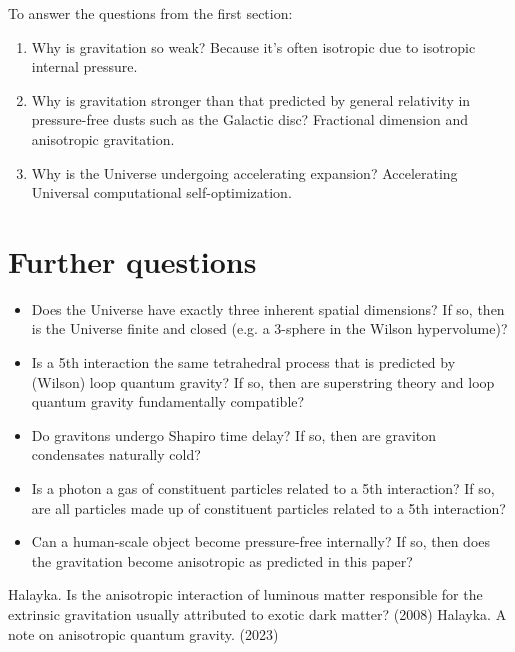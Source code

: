 \documentclass[12pt]{article}
\begin{document}
To answer the questions from the first section:
\begin{enumerate}
\item Why is gravitation so weak? 
Because it's often isotropic due to isotropic internal pressure.
\item Why is gravitation stronger than that predicted by general relativity in pressure-free dusts such as the Galactic disc? 
Fractional dimension and anisotropic gravitation.
\item Why is the Universe undergoing accelerating expansion? 
Accelerating Universal computational self-optimization.
\end{enumerate}









\section{Further questions}
\begin{itemize}
\item Does the Universe have exactly three inherent spatial dimensions?
If so, then is the Universe finite and closed (e.g. a 3-sphere in the Wilson hypervolume)?
\item Is a 5th interaction the same tetrahedral process that is predicted by (Wilson) loop quantum gravity?
If so, then are superstring theory and loop quantum gravity fundamentally compatible?
\item Do gravitons undergo Shapiro time delay?
If so, then are graviton condensates naturally cold?
\item Is a photon a gas of constituent particles related to a 5th interaction?
If so, are all particles made up of constituent particles related to a 5th interaction?
\item Can a human-scale object become pressure-free internally? 
If so, then does the gravitation become anisotropic as predicted in this paper?
\end{itemize}










\begin{thebibliography}{9}

 Halayka. Is the anisotropic interaction of luminous matter responsible for the extrinsic gravitation usually attributed to exotic dark matter? (2008)
 Halayka. A note on anisotropic quantum gravity. (2023)
\end{thebibliography}
\end{document}
